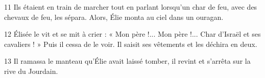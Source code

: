 
11 Ils étaient en train de marcher tout en parlant lorsqu’un char de feu, avec des chevaux de feu, les sépara. Alors, Élie monta au ciel dans un ouragan.

12 Élisée le vit et se mit à crier : « Mon père !... Mon père !... Char d’Israël et ses cavaliers ! » Puis il cessa de le voir. Il saisit ses vêtements et les déchira en deux.

13 Il ramassa le manteau qu’Élie avait laissé tomber, il revint et s’arrêta sur la rive du Jourdain.